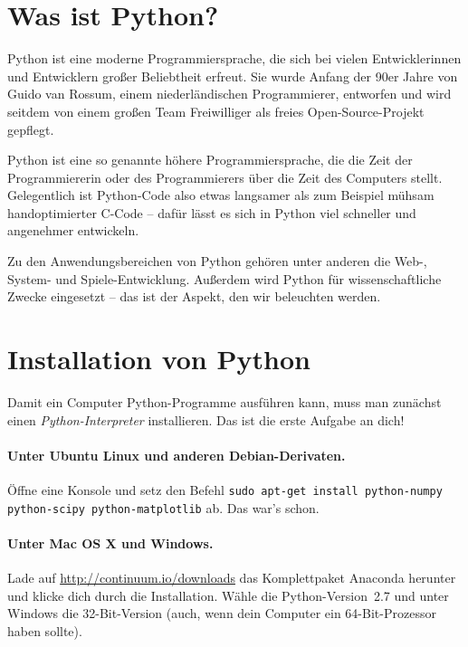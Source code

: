 \documentclass{blatt}
\begin{document}

\tableofcontents

\section{Was ist Python?}

Python ist eine moderne Programmiersprache, die sich bei vielen Entwicklerinnen
und Entwicklern großer Beliebtheit erfreut. Sie wurde Anfang der 90er Jahre von
Guido van Rossum, einem niederländischen Programmierer, entworfen und wird seitdem
von einem großen Team Freiwilliger als freies Open-Source-Projekt gepflegt.

Python ist eine so genannte höhere Programmiersprache, die die Zeit der
Programmiererin oder des Programmierers über die Zeit des Computers stellt.
Gelegentlich ist Python-Code also etwas langsamer als zum Beispiel mühsam
handoptimierter C-Code -- dafür lässt es sich in Python viel schneller und
angenehmer entwickeln.

Zu den Anwendungsbereichen von Python gehören unter anderen die Web-, System-
und Spiele-Entwicklung. Außerdem wird Python für wissenschaftliche Zwecke
eingesetzt -- das ist der Aspekt, den wir beleuchten werden.


\section{Installation von Python}

Damit ein Computer Python-Programme ausführen kann, muss man zunächst einen
\emph{Python-Interpreter} installieren. Das ist die erste Aufgabe an dich!

\paragraph{Unter Ubuntu Linux und anderen Debian-Derivaten.}
Öffne eine Konsole und setz den Befehl \texttt{sudo apt-get install
python-numpy python-scipy python-matplotlib} ab. Das war's schon.

\paragraph{Unter Mac OS X und Windows.} Lade auf
\url{http://continuum.io/downloads} das Komplettpaket Anaconda herunter und
klicke dich durch die Installation. Wähle die Python-Version~2.7 und unter
Windows die 32-Bit-Version (auch, wenn dein Computer ein 64-Bit-Prozessor haben
sollte).
\end{document}
